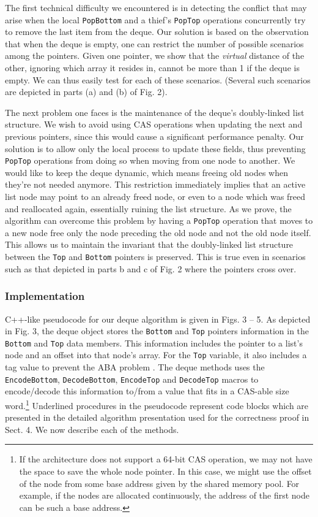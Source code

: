 The first technical difficulty we encountered is in detecting the
conflict that may arise when the local \lstinline!PopBottom! and a
thief's \lstinline!PopTop! operations concurrently try to remove the
last item from the deque. Our solution is based on the observation
that when the deque is empty, one can restrict the number of possible
scenarios among the pointers. Given one pointer, we show that the
\emph{virtual} distance of the other, ignoring which array it resides in,
cannot be more than 1 if the deque is empty. We can thus easily test
for each of these scenarios. (Several such scenarios are depicted in
parts (a) and (b) of Fig. 2).

The next problem one faces is the maintenance of the deque's
doubly-linked list structure. We wish to avoid using CAS operations
when updating the next and previous pointers, since this would cause a
significant performance penalty. Our solution is to allow only the
local process to update these fields, thus preventing
\lstinline!PopTop! operations from doing so when moving from one node
to another. We would like to keep the deque dynamic, which means
freeing old nodes when they're not needed anymore. This restriction
immediately implies that an active list node may point to an already
freed node, or even to a node which was freed and reallocated again,
essentially ruining the list structure. As we prove, the algorithm can
overcome this problem by having a \lstinline!PopTop! operation that
moves to a new node free only the node preceding the old node and not
the old node itself. This allows us to maintain the invariant that the
doubly-linked list structure between the \lstinline!Top! and
\lstinline!Bottom! pointers is preserved. This is true even in
scenarios such as that depicted in parts b and c of Fig. 2 where the
pointers cross over.

\subsubsection{Implementation}

C++-like pseudocode for our deque algorithm is given in Figs. 3 --
5. As depicted in Fig. 3, the deque object stores the
\lstinline!Bottom! and \lstinline!Top! pointers information in the
\lstinline!Bottom! and \lstinline!Top! data members. This information
includes the pointer to a list's node and an offset into that node's
array. For the \lstinline!Top! variable, it also includes a tag value
to prevent the ABA problem \cite{Dechev2006}. The deque methods uses
the \lstinline!EncodeBottom!, \lstinline!DecodeBottom!,
\lstinline!EncodeTop! and \lstinline!DecodeTop! macros to
encode/decode this information to/from a value that fits in a CAS-able
size word.\footnote{If the architecture does not support a 64-bit CAS
  operation, we may not have the space to save the whole node
  pointer. In this case, we might use the offset of the node from some
  base address given by the shared memory pool. For example, if the
  nodes are allocated continuously, the address of the first node can
  be such a base address.} Underlined procedures in the pseudocode
represent code blocks which are presented in the detailed algorithm
presentation used for the correctness proof in Sect. 4. We now
describe each of the methods.

